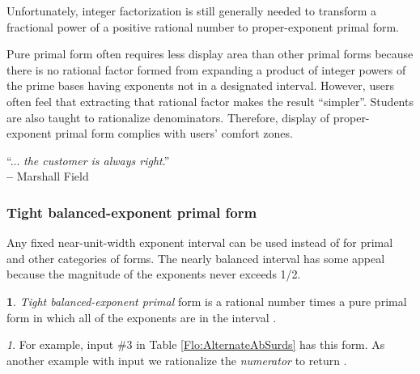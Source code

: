 \documentclass[12pt,english]{article}
\theoremstyle{definition}
\newtheorem*{defn*}{\protect\definitionname}
\theoremstyle{remark}
\newtheorem*{rem*}{\protect\remarkname}
\theoremstyle{plain}
\theoremstyle{plain}
\providecommand{\definitionname}{Definition}
\providecommand{\remarkname}{Remark}
\begin{document}
Unfortunately, integer factorization is still generally needed to
transform a fractional power of a positive rational number to proper-exponent
primal form.

Pure primal form often requires less display area than other primal
forms because there is no rational factor formed from expanding a
product of integer powers of the prime bases having exponents not
in a designated interval. However, users often feel that extracting
that rational factor makes the result ``simpler''. Students are
also taught to rationalize denominators. Therefore, display of proper-exponent
primal form complies with users' comfort zones.

\begin{flushright}
``... \textsl{the customer is always right}.''\\
\textbf{--} Marshall Field
\par\end{flushright}


\subsubsection{Tight balanced-exponent primal form}

Any fixed near-unit-width exponent interval can be used instead of
 for primal and other categories of forms. The nearly balanced
interval  has some appeal because the magnitude of the
exponents never exceeds 1/2. 
\begin{defn*}
\textsl{Tight balanced-exponent primal} form is a rational number
times a pure primal form in which all of the exponents are in the
interval .\end{defn*}
\begin{rem*}
For example, input \#3 in Table \ref{Flo:AlternateAbSurds} has this
form. As another example with input  we rationalize the
\textsl{numerator} to return .
\end{rem*}
\end{document}
